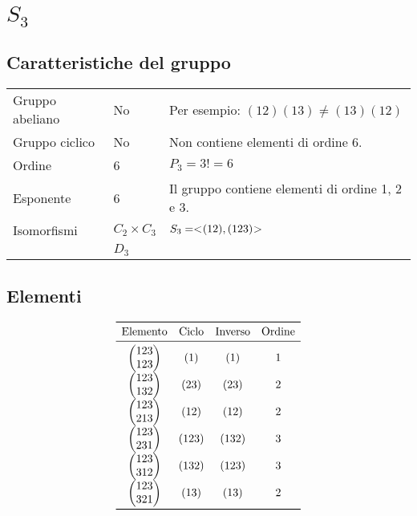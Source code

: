 \chapter{$S_3$}
\label{ch:S3}

\section{Caratteristiche del gruppo}
\label{sec:s3_caratteristiche}

\begin{center}
	\begin{tabular}{lll}
		Gruppo abeliano & No & Per esempio: $(12)(13) \neq (13)(12)$ \\
		Gruppo ciclico & No & Non contiene elementi di ordine 6. \\
		Ordine & 6 & $P_3 = 3! = 6$\\
		Esponente & 6 & Il gruppo contiene elementi di ordine 1, 2 e 3. \\
		Isomorfismi & $C_2 \times C_3$ & $S_3 = < \negmedspace (12), (123) \negmedspace >$ \\
 		&  $D_3$ & 
	\end{tabular}
\end{center}

\section{Elementi}
\label{sec:s3_elementi}

\begin{center}
	\[
	\begin{array}{cccc}
		\toprule
		\text{Elemento} & \text{Ciclo} & \text{Inverso} & \text{Ordine} \\
		\midrule
		\begin{pmatrix}
			123 \\ 123
		\end{pmatrix}
		& (1)	& (1) & 1 \\
		\begin{pmatrix}
			123 \\ 132
		\end{pmatrix}
		& (23) & (23) & 2 \\
		\begin{pmatrix}
			123 \\ 213
		\end{pmatrix}
		& (12) & (12) & 2 \\
		\begin{pmatrix}
			123 \\ 231
		\end{pmatrix}
		& (123) & (132) & 3 \\
		\begin{pmatrix}
			123 \\ 312
		\end{pmatrix}
		& (132) & (123) & 3 \\
		\begin{pmatrix}
			123 \\ 321
		\end{pmatrix}
		& (13) & (13) & 2 \\
		\bottomrule
	\end{array}
	\]
\end{center}

